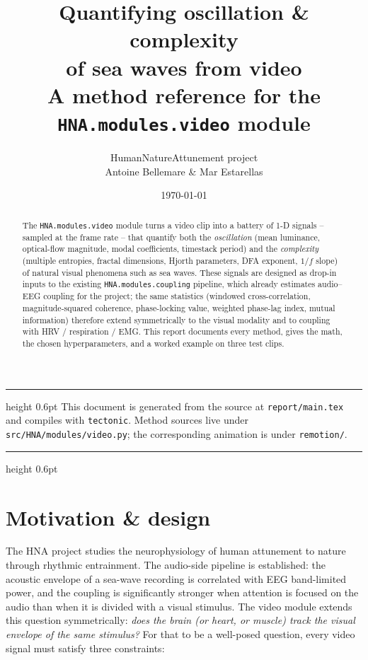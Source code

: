 \documentclass[11pt,a4paper]{article}
\title{\vspace{-1cm}\Huge\bfseries Quantifying oscillation \& complexity \\[2pt] of sea waves from video \\[6pt]
  \large\mdseries A method reference for the \texttt{HNA.modules.video} module}
\author{HumanNatureAttunement project \\[-2pt]
  \small Antoine Bellemare \& Mar Estarellas}
\date{\small \today}
\newcommand{\code}[1]{\texttt{\small #1}}
\begin{document}
\maketitle
\thispagestyle{plain}

\begin{abstract}\noindent
The \code{HNA.modules.video} module turns a video clip into a battery of 1-D
signals -- sampled at the frame rate -- that quantify both the
\emph{oscillation} (mean luminance, optical-flow magnitude, modal coefficients,
timestack period) and the \emph{complexity} (multiple entropies, fractal
dimensions, Hjorth parameters, DFA exponent, $1/f$ slope) of natural visual
phenomena such as sea waves. These signals are designed as drop-in inputs to
the existing \code{HNA.modules.coupling} pipeline, which already estimates
audio--EEG coupling for the project; the same statistics (windowed
cross-correlation, magnitude-squared coherence, phase-locking value, weighted
phase-lag index, mutual information) therefore extend symmetrically to the
visual modality and to coupling with HRV / respiration / EMG. This report
documents every method, gives the math, the chosen hyperparameters, and a
worked example on three test clips.
\end{abstract}

\vspace{4pt}
\hrule height 0.6pt
\vspace{6pt}
{\small\color{rule}
This document is generated from the source at \code{report/main.tex} and
compiles with \code{tectonic}. Method sources live under
\code{src/HNA/modules/video.py}; the corresponding animation is under
\code{remotion/}.}
\vspace{6pt}
\hrule height 0.6pt

\tableofcontents
\vspace{6pt}

\section{Motivation \& design}

The HNA project studies the neurophysiology of human attunement to nature
through rhythmic entrainment. The audio-side pipeline is established: the
acoustic envelope of a sea-wave recording is correlated with EEG band-limited
power, and the coupling is significantly stronger when attention is focused
on the audio than when it is divided with a visual stimulus. The video module
extends this question symmetrically: \emph{does the brain (or heart, or
muscle) track the visual envelope of the same stimulus?} For that to be a
well-posed question, every video signal must satisfy three constraints:
\end{document}
